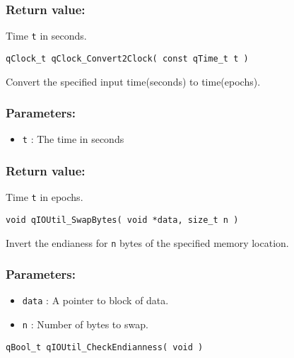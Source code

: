 \subsubsection*{Return value:}
Time \lstinline{t} in seconds.
 
\noindent\hrulefill

\begin{lstlisting}[style=CStyle]
qClock_t qClock_Convert2Clock( const qTime_t t )
\end{lstlisting}

Convert the specified input time(seconds) to time(epochs). 

\subsubsection*{Parameters:}
\begin{itemize}
    \item \lstinline{t} : The time in seconds
\end{itemize}

\subsubsection*{Return value:}
 Time \lstinline{t} in epochs.

\noindent\hrulefill

\begin{lstlisting}[style=CStyle]
void qIOUtil_SwapBytes( void *data, size_t n )
\end{lstlisting}

Invert the endianess for \lstinline{n} bytes of the specified memory location. 

\subsubsection*{Parameters:}
\begin{itemize}
    \item \lstinline{data} : A pointer to block of data.
    \item \lstinline{n} : Number of bytes to swap.
\end{itemize}

\noindent\hrulefill

\begin{lstlisting}[style=CStyle]
qBool_t qIOUtil_CheckEndianness( void )
\end{lstlisting}

